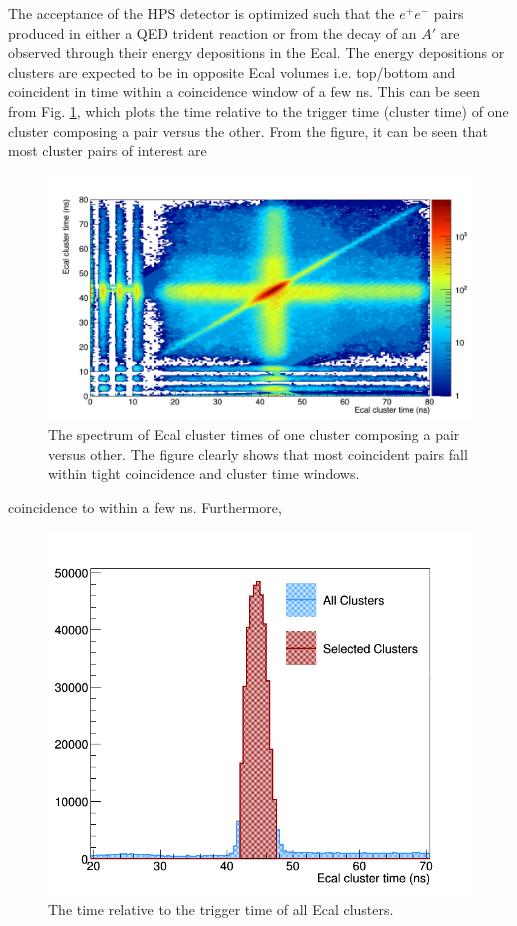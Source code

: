 The acceptance of the HPS detector is optimized such that the $e^+e^-$ pairs
produced in either a QED trident reaction or from the decay of an 
$A'$ are observed through their energy depositions in the Ecal.  The energy
depositions or clusters are expected to be in opposite Ecal volumes i.e. 
top/bottom and coincident in time within a coincidence window of a few ns.  This
can be seen from Fig. \ref{fig:cluster_times_2d}, which plots the time relative to 
the trigger time (cluster time) of one cluster composing a pair versus the 
other.  From the figure, it can be seen that most cluster pairs of interest are 
\begin{figure}[t]
    \centering
    \includegraphics[width=.9\textwidth]{images/20160428_pass4_cluster_time_v_cluster_time.png}
    \caption{The spectrum of Ecal cluster times of one cluster composing a pair 
             versus other.  The figure clearly shows that most coincident pairs 
             fall within tight coincidence and cluster time windows.}
    \label{fig:cluster_times_2d}
\end{figure}  
coincidence to within a few ns. Furthermore,  
\begin{figure}[t]
    \centering
    \includegraphics[width=.9\textwidth]{images/20160428_ecal_cluster_time.png}
    \caption{The time relative to the trigger time of all Ecal clusters.}
    \label{fig:cluster_times}
\end{figure}  
